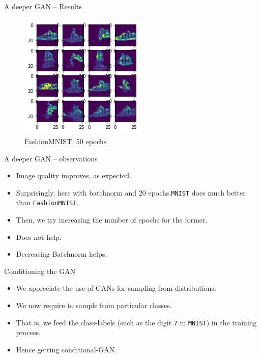 \documentclass[handout]{beamer}
\begin{document}
\begin{frame}{A deeper GAN -- Results}
    \begin{figure}[H]
        \centering
        \includegraphics[height = 6cm, width = 6cm]{convGAN_FashionMNIST_50epoc_LESSBNORM (nice).png}
        \caption{FashionMNIST, 50 epochs}
        \label{fig:my_label}
    \end{figure}
\end{frame}
\begin{frame}{A deeper GAN -- observations}
    \begin{itemize}
    \item Image quality improves, as expected.\pause
        \item Surprisingly, here with batchnorm and 20 epochs.\pause \texttt{MNIST} does much better than \texttt{FashionMNIST}.
        \item Then, we try increasing the number of epochs for the former. \pause
        \item Does not help.\pause
        \item Decreasing Batchnorm helps.
    \end{itemize}
\end{frame}
\begin{frame}{Conditioning the GAN}
\begin{itemize}

    \item We appreciate the use of GANs for sampling from distributions.\pause
    \item We now require to sample from particular classes.\pause
    \item That is, we feed the class-labels (such as the digit \texttt{7} in \texttt{MNIST}) in the training process.\pause
    \item Hence getting conditional-GAN.
    \end{itemize}
\end{frame}
\end{document}
